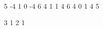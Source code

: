 \documentclass[12pt]{lista}
\begin{document}
 5 -4  1  0
-4  6  4  1 
 1  4  6  4
 0  1  4  5   

3 1 2 1
\end{document}

